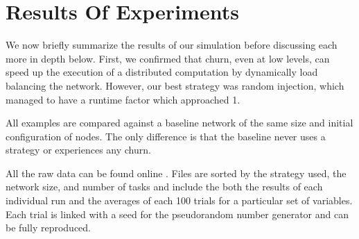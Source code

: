 \documentclass[11pt,conference]{IEEEtran}
\begin{document}
\section{Results Of Experiments}
\label{sec:autonomous-results}

We now briefly summarize the results of our simulation before discussing each more in depth below.
First, we confirmed that churn, even at low levels, can speed up the execution of a distributed computation by dynamically load balancing the network.
However, our best strategy was random injection, which managed to have a runtime factor which approached 1.

All examples are compared against a baseline network of the same size and initial configuration of nodes. 
The only difference is that the baseline never uses a strategy or experiences any churn.

All the raw data can be found online \cite{simulation-data}.
Files are sorted by the strategy used, the network size,  and number of tasks and include the both the results of each individual run and the averages of each 100 trials for a particular set of variables.
Each trial is linked with a seed for the pseudorandom number generator and can be fully reproduced.
\end{document}
